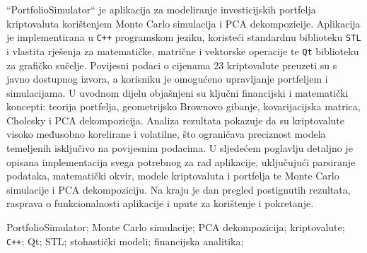 \documentclass[zavrsnirad]{fer}
\begin{document}




\begin{sazetak}
    ``PortfolioSimulator`` je aplikacija za modeliranje investicijskih
    portfelja kriptovaluta korištenjem Monte Carlo simulacija i PCA
    dekompozicije. Aplikacija je implementirana u \texttt{C++} programskom jeziku,
    koristeći standardnu biblioteku \texttt{STL} i vlastita rješenja za
    matematičke, matrične i vektorske operacije te \texttt{Qt} biblioteku
    za grafičko sučelje.
    Povijesni podaci o cijenama 23 kriptovalute preuzeti su s
    javno dostupnog izvora, a korisniku je omogućeno upravljanje
    portfeljem i simulacijama.
    U uvodnom dijelu objašnjeni su ključni financijski i matematički
    koncepti: teorija portfelja, geometrijsko Brownovo gibanje,
    kovarijacijska matrica, Cholesky i PCA dekompozicija.
    Analiza rezultata pokazuje da su kriptovalute visoko međusobno
    korelirane i volatilne, što ograničava preciznost modela
    temeljenih isključivo na povijesnim podacima.
    U sljedećem poglavlju detaljno je opisana implementacija svega
    potrebnog za rad aplikacije, uključujući parsiranje podataka,
    matematički okvir, modele kriptovaluta i portfelja te Monte Carlo
    simulacije i PCA dekompoziciju. Na kraju je dan pregled postignutih
    rezultata, rasprava o funkcionalnosti aplikacije i upute za korištenje
    i pokretanje.
\end{sazetak}

\begin{kljucnerijeci}
    PortfolioSimulator; Monte Carlo simulacije; PCA dekompozicija;
    kriptovalute; \texttt{C++}; Qt; STL; stohastički modeli; financijska analitika;
\end{kljucnerijeci}
\end{document}
